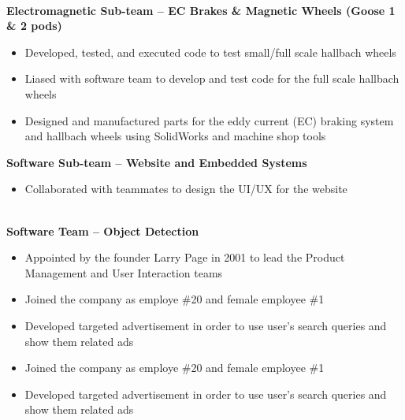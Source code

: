 \documentclass[8pt,a4paper]{altacv}
\begin{document}
 \\
\textbf{Electromagnetic Sub-team -- EC Brakes \& Magnetic Wheels (Goose 1 \& 2 pods)} \\
\begin{itemize}
\item Developed, tested, and executed code to test small/full scale hallbach wheels
\item Liased with software team to develop and test code for the full scale hallbach wheels
\item Designed and manufactured parts for the eddy current (EC) braking system and hallbach wheels using SolidWorks and machine shop tools
\end{itemize}
\textbf{Software Sub-team -- Website and Embedded Systems}\\
\begin{itemize}
\item Collaborated with teammates to design the UI/UX for the website
\end{itemize}
\divider

\\
\textbf{Software Team -- Object Detection} \\
\begin{itemize}
\item Appointed by the founder Larry Page in 2001 to lead the Product Management and User Interaction teams
\end{itemize}
\divider

\begin{itemize}
\item Joined the company as employe \#20 and female employee \#1
\item Developed targeted advertisement in order to use user's search queries and show them related ads
\end{itemize}
\bigskip

\begin{itemize}
\item Joined the company as employe \#20 and female employee \#1
\item Developed targeted advertisement in order to use user's search queries and show them related ads
\end{itemize}
\end{document}
